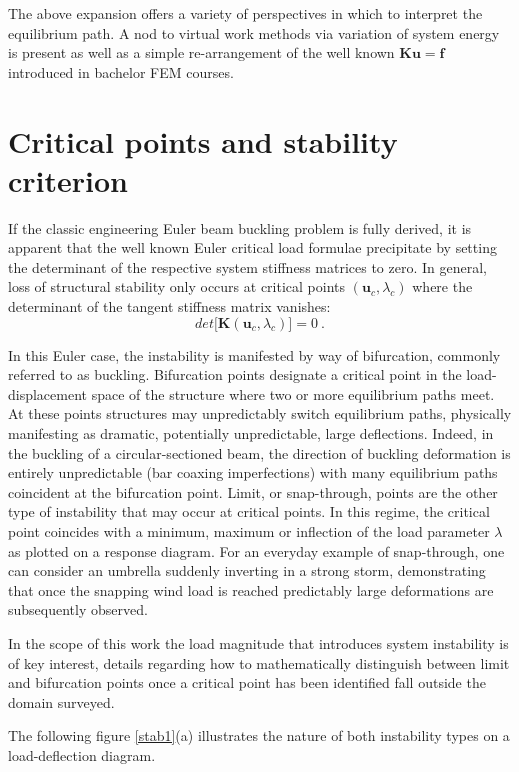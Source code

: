 The above expansion offers a variety of perspectives in which to interpret the equilibrium path. A nod to virtual work methods via variation of system energy is present as well as a simple re-arrangement of the well known $\mathbf{Ku} = \mathbf{f}$ introduced in bachelor FEM courses.

\section{Critical points and stability criterion}
 If the classic engineering Euler beam buckling problem is fully derived, it is apparent that the well known Euler critical load formulae precipitate by setting the determinant of the respective system stiffness matrices to zero. In general, loss of structural stability only occurs at critical points $(\mathbf{u}_c,\lambda_c)$ where the determinant of the tangent stiffness matrix vanishes:
 \begin{equation} 
 det\big[\mathbf{K}(\mathbf{u}_c,\lambda_c)\big] = 0
 \label{eqstab1}\ .
 \end{equation}
 
 In this Euler case, the instability is manifested by way of bifurcation, commonly referred to as buckling. Bifurcation points designate a critical point in the load-displacement space of the structure where two or more equilibrium paths meet. At these points structures may unpredictably switch equilibrium paths, physically manifesting as dramatic, potentially unpredictable, large deflections. Indeed, in the buckling of a circular-sectioned beam, the direction of buckling deformation is entirely unpredictable (bar coaxing imperfections) with many equilibrium paths coincident at the bifurcation point. Limit, or snap-through, points are the other type of instability that may occur at critical points. In this regime, the critical point coincides with a minimum, maximum or inflection of the load parameter $\lambda$ as plotted on a response diagram. For an everyday example of snap-through, one can consider an umbrella suddenly inverting in a strong storm, demonstrating that once the snapping wind load is reached predictably large deformations are subsequently observed. 
 
 In the scope of this work the load magnitude that introduces system instability is of key interest, details regarding how to mathematically distinguish between limit and bifurcation points once a critical point has been identified fall outside the domain surveyed. 
 
 The following figure \ref{stab1}(a) illustrates the nature of both instability types on a load-deflection diagram.

